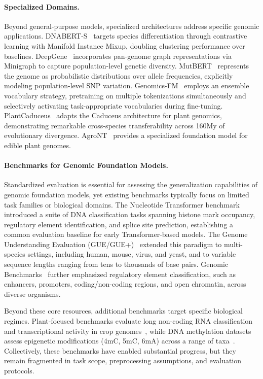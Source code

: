 \documentclass{llmxive}
\begin{document}
\paragraph{Specialized Domains.}
Beyond general-purpose models, specialized architectures address specific genomic applications. DNABERT-S~\citep{zhou2024dnabertspioneeringspeciesdifferentiation} targets species differentiation through contrastive learning with Manifold Instance Mixup, doubling clustering performance over baselines. DeepGene~\citep{Zhang2024.04.24.590879} incorporates pan-genome graph representations via Minigraph to capture population-level genetic diversity. MutBERT~\citep{Long2025.01.23.634452} represents the genome as probabilistic distributions over allele frequencies, explicitly modeling population-level SNP variation. Genomics-FM~\citep{Ye2024.07.16.603653} employs an ensemble vocabulary strategy, pretraining on multiple tokenizations simultaneously and selectively activating task-appropriate vocabularies during fine-tuning. PlantCaduceus~\citep{doi:10.1073/pnas.2421738122} adapts the Caduceus architecture for plant genomics, demonstrating remarkable cross-species transferability across 160My of evolutionary divergence. AgroNT~\citep{mendoza2023foundational} provides a specialized foundation model for edible plant genomes.

\paragraph{Benchmarks for Genomic Foundation Models.}
Standardized evaluation is essential for assessing the generalization capabilities of genomic foundation models, yet existing benchmarks typically focus on limited task families or biological domains. The Nucleotide Transformer benchmark~\citep{dalla2023nucleotide} introduced a suite of DNA classification tasks spanning histone mark occupancy, regulatory element identification, and splice site prediction, establishing a common evaluation baseline for early Transformer-based models. The Genome Understanding Evaluation (GUE/GUE+)~\citep{zhou2024dnabert2efficientfoundationmodel} extended this paradigm to multi-species settings, including human, mouse, virus, and yeast, and to variable sequence lengths ranging from tens to thousands of base pairs. Genomic Benchmarks~\citep{Gresova2022.06.08.495248} further emphasized regulatory element classification, such as enhancers, promoters, coding/non-coding regions, and open chromatin, across diverse organisms.

Beyond these core resources, additional benchmarks target specific biological regimes. Plant-focused benchmarks evaluate long non-coding RNA classification and transcriptional activity in crop genomes~\citep{yang2025omnigenbenchmodularplatformreproducible}, while DNA methylation datasets assess epigenetic modifications (4mC, 5mC, 6mA) across a range of taxa~\citep{Feng2024.08.16.608288}. Collectively, these benchmarks have enabled substantial progress, but they remain fragmented in task scope, preprocessing assumptions, and evaluation protocols.
\end{document}
